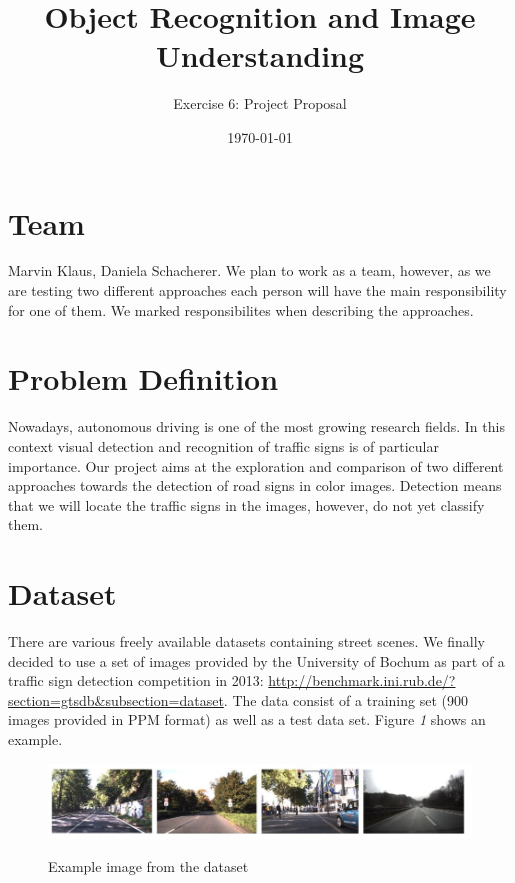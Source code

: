 \documentclass[a4paper,11pt]{scrartcl}
\title{\vspace{-1cm}Object Recognition and Image Understanding}
\subtitle{Exercise 6: Project Proposal} \date{\today}
\begin{document}
\maketitle

\section*{Team}
Marvin Klaus, Daniela Schacherer. We plan to work as a team, however, as we are testing two different approaches each person will have the main responsibility for one of them. We marked responsibilites when describing the approaches.

\section*{Problem Definition}
Nowadays, autonomous driving is one of the most growing research fields. In this context visual detection and recognition of traffic signs is of particular importance. Our project aims at the exploration and comparison of two different approaches towards the detection of road signs in color images. Detection means that we will locate the traffic signs in the images, however, do not yet classify them.

\section*{Dataset}
There are various freely available datasets containing street scenes. We finally decided to use a set of images provided by the University of Bochum as part of a traffic sign detection competition in 2013: \url{http://benchmark.ini.rub.de/?section=gtsdb&subsection=dataset}. The data consist of a training set (900 images provided in PPM format) as well as a test data set. 
Figure \textit{1} shows an example. 

	\begin{figure}[htbp] 
		\centering	
		\includegraphics[width=\linewidth]{./example}
		\label{fig:ex}
		\caption{Example image from the dataset}
	\end{figure}
\end{document}
